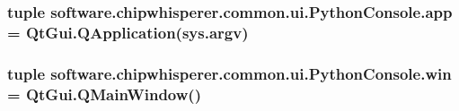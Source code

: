 \subsubsection[{app}]{\setlength{\rightskip}{0pt plus 5cm}tuple software.\+chipwhisperer.\+common.\+ui.\+Python\+Console.\+app = Qt\+Gui.\+Q\+Application(sys.\+argv)}\label{namespacesoftware_1_1chipwhisperer_1_1common_1_1ui_1_1PythonConsole_a84a2ea32d94c8b514b12cb2de7fe7f66}
\hypertarget{namespacesoftware_1_1chipwhisperer_1_1common_1_1ui_1_1PythonConsole_a2d51c691a41358808762dc8a48207aa1}{}
\subsubsection[{win}]{\setlength{\rightskip}{0pt plus 5cm}tuple software.\+chipwhisperer.\+common.\+ui.\+Python\+Console.\+win = Qt\+Gui.\+Q\+Main\+Window()}\label{namespacesoftware_1_1chipwhisperer_1_1common_1_1ui_1_1PythonConsole_a2d51c691a41358808762dc8a48207aa1}
